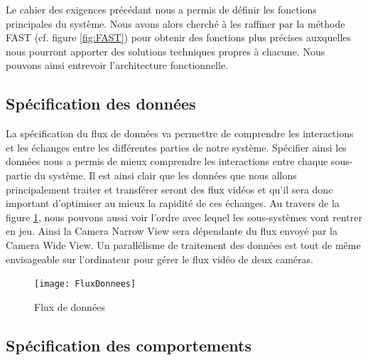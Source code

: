 Le cahier des exigences précédant nous a permis de définir les fonctions principales du système. Nous avons alors cherché à les raffiner par la méthode FAST (cf. figure \ref{fig:FAST}) pour obtenir des fonctions plus précises auxquelles nous pourront apporter des solutions techniques propres à chacune. Nous pouvons ainsi entrevoir l'architecture fonctionnelle.

\subsection{Spécification des données}

La spécification du flux de données va permettre de comprendre les interactions et les échanges entre les différentes parties de notre système. Spécifier ainsi les données nous a permis de mieux comprendre les interactions entre chaque sous-partie du système. Il est ainsi clair que les données que nous allons principalement traiter et transférer seront des flux vidéos et qu’il sera donc important d’optimiser au mieux la rapidité de ces échanges.
Au travers de la figure \ref{fig:fluxDonnees}, nous pouvons aussi voir l’ordre avec lequel les sous-systèmes vont rentrer en jeu. Ainsi la Camera Narrow View sera dépendante du flux envoyé par la Camera Wide View. Un parallélisme de traitement des données est tout de même envisageable sur l'ordinateur pour gérer le flux vidéo de deux caméras.

\begin{figure}[h]
  \centering
  \texttt{[image: FluxDonnees]}
  \caption{Flux de données}
  \label{fig:fluxDonnees}
\end{figure}

\subsection{Spécification des comportements}

